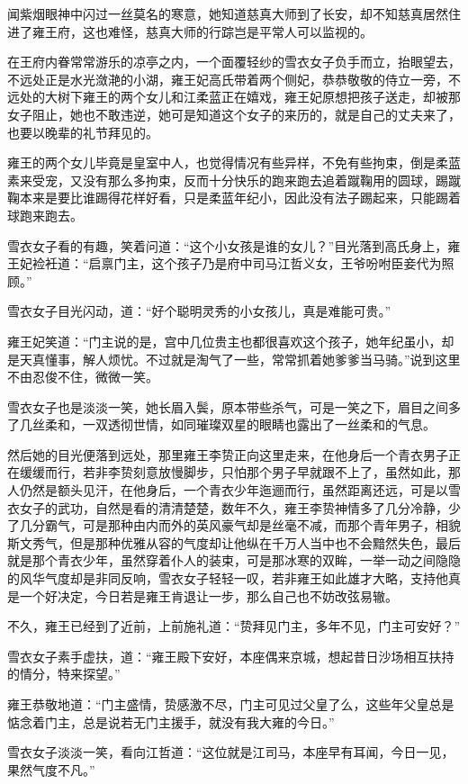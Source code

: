 闻紫烟眼神中闪过一丝莫名的寒意，她知道慈真大师到了长安，却不知慈真居然住进了雍王府，这也难怪，慈真大师的行踪岂是平常人可以监视的。

在王府内眷常常游乐的凉亭之内，一个面覆轻纱的雪衣女子负手而立，抬眼望去，不远处正是水光潋滟的小湖，雍王妃高氏带着两个侧妃，恭恭敬敬的侍立一旁，不远处的大树下雍王的两个女儿和江柔蓝正在嬉戏，雍王妃原想把孩子送走，却被那女子阻止，她也不敢违逆，她可是知道这个女子的来历的，就是自己的丈夫来了，也要以晚辈的礼节拜见的。

雍王的两个女儿毕竟是皇室中人，也觉得情况有些异样，不免有些拘束，倒是柔蓝素来受宠，又没有那么多拘束，反而十分快乐的跑来跑去追着蹴鞠用的圆球，踢蹴鞠本来是要比谁踢得花样好看，只是柔蓝年纪小，因此没有法子踢起来，只能踢着球跑来跑去。

雪衣女子看的有趣，笑着问道：“这个小女孩是谁的女儿？”目光落到高氏身上，雍王妃裣衽道：“启禀门主，这个孩子乃是府中司马江哲义女，王爷吩咐臣妾代为照顾。”

雪衣女子目光闪动，道：“好个聪明灵秀的小女孩儿，真是难能可贵。”

雍王妃笑道：“门主说的是，宫中几位贵主也都很喜欢这个孩子，她年纪虽小，却是天真懂事，解人烦忧。不过就是淘气了一些，常常抓着她爹爹当马骑。”说到这里不由忍俊不住，微微一笑。

雪衣女子也是淡淡一笑，她长眉入鬓，原本带些杀气，可是一笑之下，眉目之间多了几丝柔和，一双透彻世情，如同璀璨双星的眼睛也露出了一丝柔和的气息。

然后她的目光便落到远处，那里雍王李贽正向这里走来，在他身后一个青衣男子正在缓缓而行，若非李贽刻意放慢脚步，只怕那个男子早就跟不上了，虽然如此，那人仍然是额头见汗，在他身后，一个青衣少年迤逦而行，虽然距离还远，可是以雪衣女子的武功，自然是看的清清楚楚，数年不久，雍王李贽神情多了几分冷静，少了几分霸气，可是那种由内而外的英风豪气却是丝毫不减，而那个青年男子，相貌斯文秀气，但是那种优雅从容的气度却让他纵在千万人当中也不会黯然失色，最后就是那个青衣少年，虽然穿着仆人的装束，可是那冰寒的双眸，一举一动之间隐隐的风华气度却是非同反响，雪衣女子轻轻一叹，若非雍王如此雄才大略，支持他真是一个好决定，今日若是雍王肯退让一步，那么自己也不妨改弦易辙。

不久，雍王已经到了近前，上前施礼道：“贽拜见门主，多年不见，门主可安好？”

雪衣女子素手虚扶，道：“雍王殿下安好，本座偶来京城，想起昔日沙场相互扶持的情分，特来探望。”

雍王恭敬地道：“门主盛情，贽感激不尽，门主可见过父皇了么，这些年父皇总是惦念着门主，总是说若无门主援手，就没有我大雍的今日。”

雪衣女子淡淡一笑，看向江哲道：“这位就是江司马，本座早有耳闻，今日一见，果然气度不凡。”


